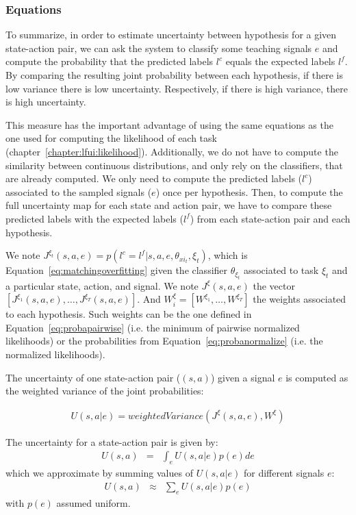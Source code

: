 \visuopti{\newpage}

\subsubsection*{Equations}

To summarize, in order to estimate uncertainty between hypothesis for a given state-action pair, we can ask the system to classify some teaching signals $e$ and compute the probability that the predicted labels $l^c$ equals the expected labels $l^f$. By comparing the resulting joint probability between each hypothesis, if there is low variance there is low uncertainty. Respectively, if there is high variance, there is high uncertainty. 

This measure has the important advantage of using the same equations as the one used for computing the likelihood of each task (chapter~\ref{chapter:lfui:likelihood}). Additionally, we do not have to compute the similarity between continuous distributions, and only rely on the classifiers, that are already computed. We only need to compute the predicted labels ($l^c$) associated to the sampled signals ($e$) once per hypothesis. Then, to compute the full uncertainty map for each state and action pair, we have to compare these predicted labels with the expected labels ($l^f$) from each state-action pair and each hypothesis.

We note $J^{\xi_t}(s,a,e) = p(l^c = l^f | s, a, e, \theta_{xi_t}, \xi_t)$, which is Equation~\ref{eq:matchingoverfitting} given the classifier $\theta_{\xi_t}$ associated to task $\xi_t$ and a particular state, action, and signal. We note $J^{\xi}(s,a,e)$ the vector $[J^{\xi_1}(s,a,e), \ldots, J^{\xi_T}(s,a,e)]$. And $W_{i}^{\xi} = [W^{\xi_1}, \ldots, W^{\xi_T}]$ the weights associated to each hypothesis. Such weights can be the one defined in Equation~\ref{eq:probapairwise} (i.e. the minimum of pairwise normalized likelihoods) or the probabilities from Equation~\ref{eq:probanormalize} (i.e. the normalized likelihoods).

The uncertainty of one state-action pair ($(s,a)$) given a signal $e$ is computed as the weighted variance of the joint probabilities:

\begin{eqnarray}
U(s,a|e) = weightedVariance(J^{\xi}(s,a,e), W^{\xi})
\label{eq:planningOneSignal}
\end{eqnarray}

The uncertainty for a state-action pair is given by:
\begin{eqnarray}
U(s,a) & = & \int_{e} U(s,a|e) p(e) de
\end{eqnarray}
which we approximate by summing values of $U(s,a|e)$ for different signals $e$:
\begin{eqnarray}
U(s,a) & \approx & \sum_{e} U(s,a|e) p(e)
\label{eq:planning}
\end{eqnarray}
with $p(e)$ assumed uniform.

